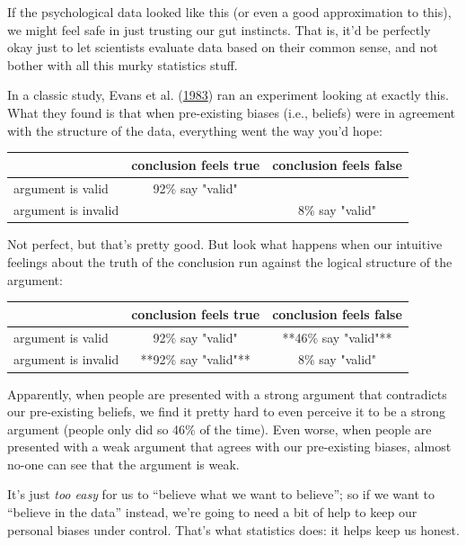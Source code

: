 \documentclass[
]{book}
\theoremstyle{definition}
\theoremstyle{definition}
\theoremstyle{definition}
\theoremstyle{definition}
\theoremstyle{remark}
\begin{document}
If the psychological data looked like this (or even a good approximation to this), we might feel safe in just trusting our gut instincts. That is, it'd be perfectly okay just to let scientists evaluate data based on their common sense, and not bother with all this murky statistics stuff.

In a classic study, Evans et al. (\protect\hyperlink{ref-Evans1983}{1983}) ran an experiment looking at exactly this. What they found is that when pre-existing biases (i.e., beliefs) were in agreement with the structure of the data, everything went the way you'd hope:

\begin{table}[H]
\centering
\begin{tabular}{lcc}
\toprule
  & conclusion feels true & conclusion feels false\\
\midrule
argument is valid & 92\% say "valid" & \\
argument is invalid &  & 8\% say "valid"\\
\bottomrule
\end{tabular}
\end{table}

Not perfect, but that's pretty good. But look what happens when our intuitive feelings about the truth of the conclusion run against the logical structure of the argument:

\begin{table}[H]
\centering
\begin{tabular}{lcc}
\toprule
  & conclusion feels true & conclusion feels false\\
\midrule
argument is valid & 92\% say "valid" & **46\% say "valid"**\\
argument is invalid & **92\% say "valid"** & 8\% say "valid"\\
\bottomrule
\end{tabular}
\end{table}

Apparently, when people are presented with a strong argument that contradicts our pre-existing beliefs, we find it pretty hard to even perceive it to be a strong argument (people only did so 46\% of the time). Even worse, when people are presented with a weak argument that agrees with our pre-existing biases, almost no-one can see that the argument is weak.

It's just \emph{too easy} for us to ``believe what we want to believe''; so if we want to ``believe in the data'' instead, we're going to need a bit of help to keep our personal biases under control. That's what statistics does: it helps keep us honest.
\end{document}
